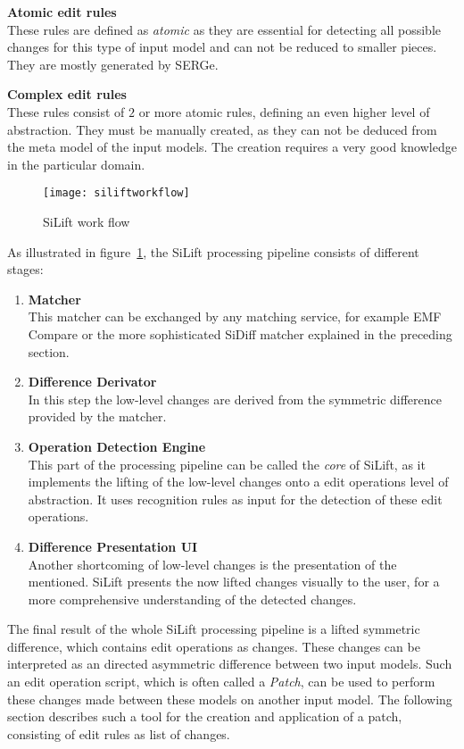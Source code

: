 \textbf{Atomic edit rules} \\
These rules are defined as \textit{atomic} as they are essential for detecting
all possible changes for this type of input model and can not be reduced to
smaller pieces. They are mostly generated by \ac{SERGe}.

\textbf{Complex edit rules} \\
These rules consist of $2$ or more atomic rules, defining an even higher level
of abstraction. They must be manually created, as they can not be deduced from
the meta model of the input models. The creation requires a very good knowledge
in the particular domain.
\newpage
 \begin{figure}[h!]
\begin{center}
\texttt{[image: siliftworkflow]}\\
\end{center}
\caption{SiLift work flow~\cite{SiLiftURL}}
\label{siliftworkflow}
\end{figure}

As illustrated in figure~\ref{siliftworkflow}, the SiLift processing pipeline
consists of different stages:
\begin{enumerate}
  \item  \textbf{Matcher} \\
  		This matcher can be exchanged by any matching service, for example EMF
  		Compare or the more sophisticated SiDiff matcher explained in the preceding
  		section.
  \item  \textbf{Difference Derivator} \\
  	    In this step the low-level changes are derived from the symmetric
  	    difference provided by the matcher.
  \item  \textbf{Operation Detection Engine} \\
  		This part of the processing pipeline can be called the \textit{core} of
  		SiLift, as it implements the lifting of the low-level changes onto a edit
  		operations level of abstraction. It uses recognition rules as input for the
  		detection of these edit operations.
  \item  \textbf{Difference Presentation UI} \\
  		Another shortcoming of low-level changes is the presentation of the
  		mentioned. SiLift presents the now lifted changes visually to the user,
  		for a more comprehensive understanding of the detected changes.
\end{enumerate}
The final result of the whole SiLift processing pipeline is a lifted symmetric
difference, which contains edit operations as changes. These changes can be
interpreted as an directed asymmetric difference between two input models.  
Such an edit operation script, which is often called a \textit{Patch}, can be
used to perform these changes made between these models on another input model.
The following section describes such a tool for the creation and application of
a patch, consisting of edit rules as list of changes.
